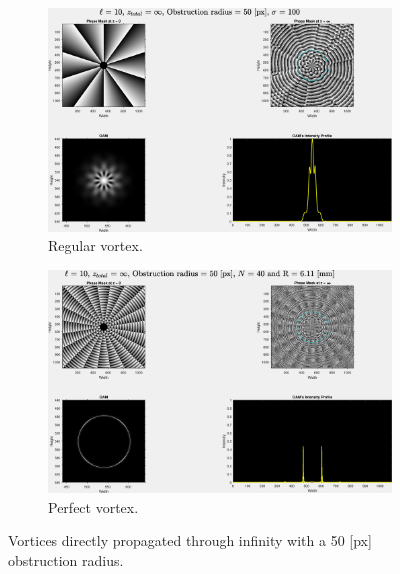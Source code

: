 \begin{figure}[htbp]
    \centering
    \begin{subfigure}[b]{0.45\textwidth}
        \centering
        \includegraphics[width=\textwidth]{images/c04/type=0_r=50_zi=0_zf=Inf.eps}
        \caption{Regular vortex.}
    \end{subfigure}
    \hfill
    \begin{subfigure}[b]{0.45\textwidth}
        \centering
        \includegraphics[width=\textwidth]{images/c04/type=1_r=50_zi=0_zf=Inf.eps}
        \caption{Perfect vortex.}
    \end{subfigure}
    \caption{Vortices directly propagated through infinity with a 50 [px] obstruction radius.}
    \label{fig:Vortices_r=60_z=inf}
\end{figure}

